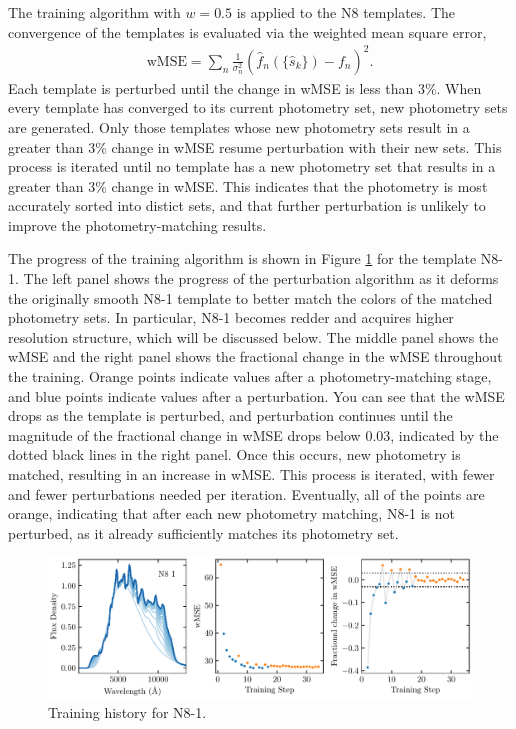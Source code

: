 The training algorithm with $w=0.5$ is applied to the N8 templates.
The convergence of the templates is evaluated via the weighted mean square error,
\begin{align}
    \text{wMSE} = \sum_n \frac{1}{\sigma_n^2}(\hat{f}_n(\{\hat{s}_k\}) - f_n)^2.
\end{align}
Each template is perturbed until the change in wMSE is less than 3\%.
When every template has converged to its current photometry set, new photometry sets are generated.
Only those templates whose new photometry sets result in a greater than 3\% change in wMSE resume perturbation with their new sets.
This process is iterated until no template has a new photometry set that results in a greater than 3\% change in wMSE.
This indicates that the photometry is most accurately sorted into distict sets, and that further perturbation is unlikely to improve the photometry-matching results.

The progress of the training algorithm is shown in Figure \ref{fig:training} for the template N8-1.
The left panel shows the progress of the perturbation algorithm as it deforms the originally smooth N8-1 template to better match the colors of the matched photometry sets.
In particular, N8-1 becomes redder and acquires higher resolution structure, which will be discussed below.
The middle panel shows the wMSE and the right panel shows the fractional change in the wMSE throughout the training.
Orange points indicate values after a photometry-matching stage, and blue points indicate values after a perturbation.
You can see that the wMSE drops as the template is perturbed, and perturbation continues until the magnitude of the fractional change in wMSE drops below 0.03, indicated by the dotted black lines in the right panel.
Once this occurs, new photometry is matched, resulting in an increase in wMSE.
This process is iterated, with fewer and fewer perturbations needed per iteration.
Eventually, all of the points are orange, indicating that after each new photometry matching, N8-1 is not perturbed, as it already sufficiently matches its photometry set.

\begin{figure}
    \centering
    \includegraphics{figures/N8_1_training_history.pdf}
    \caption{Training history for N8-1. }
    \label{fig:training}
\end{figure}

